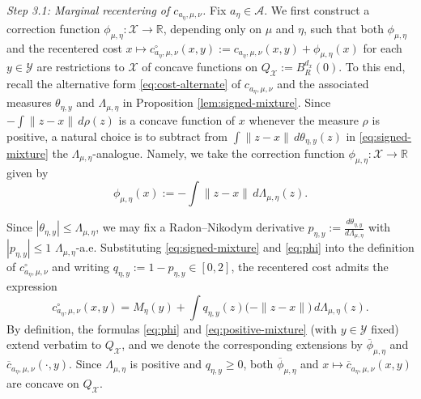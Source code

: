 \documentclass[11pt]{amsart}
\theoremstyle{definition}
\theoremstyle{remark}
\newcommand{\R}{\mathbb{R}}
\newcommand{\1}{\mathbf{1}}
\numberwithin{equation}{section}
\begin{document}
\emph{Step 3.1: Marginal recentering of $c_{a_\eta,\mu,\nu}$.}
Fix $a_{\eta} \in \mathcal{A}$. We first construct a correction function
$\phi_{\mu,\eta}:\mathcal{X}\to\R$, depending only on $\mu$ and $\eta$,
such that both $\phi_{\mu,\eta}$ and the recentered cost
$x\mapsto c^\circ_{a_\eta,\mu,\nu}(x,y)
:= c_{a_\eta,\mu,\nu}(x,y)+\phi_{\mu,\eta}(x)$ for each $y\in \mathcal{Y}$
are restrictions to $\mathcal{X}$ of concave functions on
$Q_\mathcal{X}:= B_{R}^{d_x}(0)$. To this end, recall the alternative form
\eqref{eq:cost-alternate} of $c_{a_\eta,\mu,\nu}$ and the associated
measures $\theta_{\eta,y}$ and $\Lambda_{\mu,\eta}$ in Proposition \ref{lem:signed-mixture}. Since
$-\int \|z-x\|\,d\rho(z)$ is a concave function of $x$ whenever the measure
$\rho$ is positive, a natural choice is to subtract from
$\int \|z-x\|\,d\theta_{\eta,y}(z)$ in \eqref{eq:signed-mixture} the
$\Lambda_{\mu,\eta}$-analogue. Namely, we take the correction function
$\phi_{\mu,\eta}:\mathcal{X}\to\R$ given by
\begin{equation}\label{eq:phi}
  \phi_{\mu,\eta}(x):=-\int \|z-x\|\,d\Lambda_{\mu,\eta}(z).
\end{equation}

Since $|\theta_{\eta,y}|\le \Lambda_{\mu,\eta}$, we may fix a Radon--Nikodym derivative
$p_{\eta,y}:=\frac{d\theta_{\eta,y}}{d\Lambda_{\mu,\eta}}$ with
$|p_{\eta,y}|\le 1$ $\Lambda_{\mu,\eta}$-a.e. Substituting
\eqref{eq:signed-mixture} and \eqref{eq:phi} into the definition of
$c^\circ_{a_\eta,\mu,\nu}$ and writing
$q_{\eta,y}:=1-p_{\eta,y}\in[0,2]$, the recentered cost admits the
expression
\begin{equation}\label{eq:positive-mixture}
  c^\circ_{a_\eta,\mu,\nu}(x,y)
  = M_\eta(y)+\int q_{\eta,y}(z)\bigl(-\|z-x\|\bigr)\,d\Lambda_{\mu,\eta}(z).
\end{equation}
By definition, the formulas \eqref{eq:phi} and \eqref{eq:positive-mixture}
(with $y\in \mathcal{Y}$ fixed) extend verbatim to $Q_\mathcal{X}$, and we
denote the corresponding extensions by $\overline{\phi}_{\mu,\eta}$ and
$\overline{c}_{a_\eta,\mu,\nu}(\cdot, y)$. Since $\Lambda_{\mu,\eta}$ is positive and
$q_{\eta,y}\ge 0$, both $\overline{\phi}_{\mu,\eta}$ and
$x\mapsto \overline{c}_{a_\eta,\mu,\nu}(x,y)$ are concave on
$Q_\mathcal{X}$.
\end{document}

